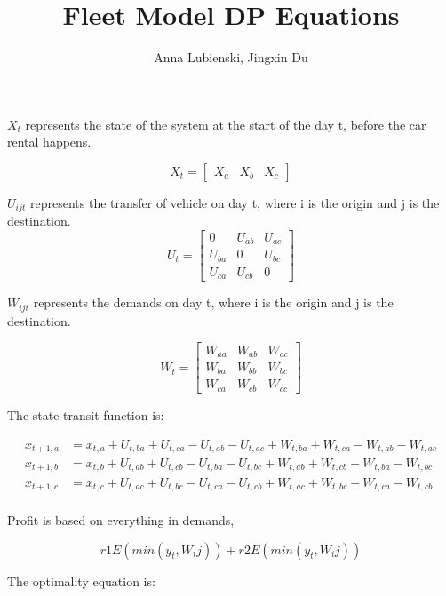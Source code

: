 \documentclass{article}
\title{Fleet Model DP Equations}
\author{Anna Lubienski, Jingxin Du}
\begin{document}
\maketitle

$X_{t}$ represents the state of the system at the start of the day t, before the car rental happens.

$$
X_t = \begin{bmatrix}
X_{a} & X_{b} & X_{c}
\end{bmatrix}
$$

$U_{ijt}$ represents the transfer of vehicle on day t, where i is the origin and j is the destination.
$$
U_t = 
\begin{bmatrix}
0 & U_{ab} & U_{ac}\\
U_{ba} & 0 & U_{bc}\\
U_{ca} & U_{cb} & 0
\end{bmatrix}
$$

$W_{ijt}$ represents the demands on day t, where i is the origin and j is the destination.

$$
W_t = 
\begin{bmatrix}
W_{aa} & W_{ab} & W_{ac}\\
W_{ba} & W_{bb} & W_{bc}\\
W_{ca} & W_{cb} & W_{cc}
\end{bmatrix}
$$

The state transit function is:

\begin{align*}
x_{t+1, a} &= x_{t, a} + U_{t,ba} + U_{t,ca} - U_{t,ab} - U_{t,ac} + W_{t, ba} + W_{t, ca} - W_{t, ab} - W_{t, ac} \\
x_{t+1, b} &= x_{t, b} + U_{t,ab} + U_{t,cb} - U_{t,ba} - U_{t,bc} + W_{t, ab} + W_{t, cb} - W_{t, ba} - W_{t, bc} \\
x_{t+1, c} &= x_{t, c} + U_{t,ac} + U_{t,bc} - U_{t,ca} - U_{t,cb} + W_{t, ac} + W_{t, bc} - W_{t, ca} - W_{t, cb} \\
\end{align*}


Profit is based on everything in demands,

$$
r1E(min(y_t, W_ij)) + r2E(min(y_t, W_ij))
$$

The optimality equation is:
\end{document}

